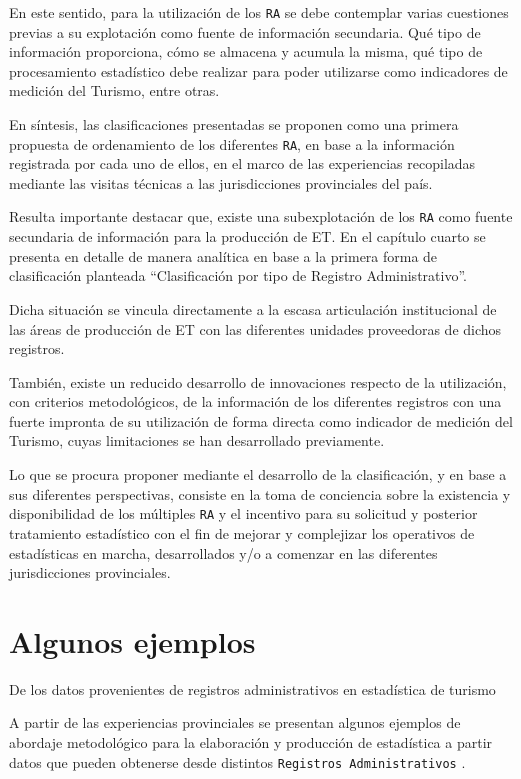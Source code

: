 \documentclass[
]{book}
\begin{document}
En este sentido, para la utilización de los \texttt{RA} se debe contemplar varias cuestiones previas a su explotación como fuente de información secundaria. Qué tipo de información proporciona, cómo se almacena y acumula la misma, qué tipo de procesamiento estadístico debe realizar para poder utilizarse como indicadores de medición del Turismo, entre otras.

En síntesis, las clasificaciones presentadas se proponen como una primera propuesta de ordenamiento de los diferentes \texttt{RA}, en base a la información registrada por cada uno de ellos, en el marco de las experiencias recopiladas mediante las visitas técnicas a las jurisdicciones provinciales del país.

Resulta importante destacar que, existe una subexplotación de los \texttt{RA} como fuente secundaria de información para la producción de ET. En el capítulo cuarto se presenta en detalle de manera analítica en base a la primera forma de clasificación planteada ``Clasificación por tipo de Registro Administrativo''.

Dicha situación se vincula directamente a la escasa articulación institucional de las áreas de producción de ET con las diferentes unidades proveedoras de dichos registros.

También, existe un reducido desarrollo de innovaciones respecto de la utilización, con criterios metodológicos, de la información de los diferentes registros con una fuerte impronta de su utilización de forma directa como indicador de medición del Turismo, cuyas limitaciones se han desarrollado previamente.

Lo que se procura proponer mediante el desarrollo de la clasificación, y en base a sus diferentes perspectivas, consiste en la toma de conciencia sobre la existencia y disponibilidad de los múltiples \texttt{RA} y el incentivo para su solicitud y posterior tratamiento estadístico con el fin de mejorar y complejizar los operativos de estadísticas en marcha, desarrollados y/o a comenzar en las diferentes jurisdicciones provinciales.

\hypertarget{algunos-ejemplos}{%
\chapter{\texorpdfstring{\textbf{Algunos ejemplos}}{Algunos ejemplos}}\label{algunos-ejemplos}}

De los datos provenientes de registros administrativos en estadística de turismo

A partir de las experiencias provinciales se presentan algunos ejemplos de abordaje metodológico para la elaboración y producción de estadística a partir datos que pueden obtenerse desde distintos \texttt{Registros\ Administrativos} .
\end{document}
